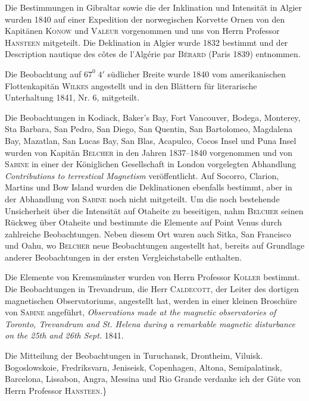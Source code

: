 Die Bestimmungen in Gibraltar sowie die der Inklination und Intensität in Algier wurden 1840 auf einer Expedition der norwegischen Korvette Ornen von den Kapitänen \textsc{Konow} und \textsc{Valeur} vorgenommen und uns von Herrn Professor \textsc{Hansteen} mitgeteilt. Die Deklination in Algier wurde 1832 bestimmt und der Description nautique des côtes de l’Algérie par \textsc{Bérard} (Paris 1839) entnommen.

Die Beobachtung auf $67^0\;4'$ südlicher Breite wurde 1840 vom amerikanischen Flottenkapitän \textsc{Wilkes} angestellt und in den Blättern für literarische Unterhaltung 1841, Nr. 6, mitgeteilt.

Die Beobachtungen in Kodiack, Baker’s Bay, Fort Vancouver, Bodega, Monterey, Sta Barbara, San Pedro, San Diego, San Quentin, San Bartolomeo, Magdalena Bay, Mazatlan, San Lucas Bay, San Blas, Acapulco, Cocos Insel und Puna Insel wurden von Kapitän \textsc{Belcher} in den Jahren 1837–1840 vorgenommen und von \textsc{Sabine} in einer der Königlichen Gesellschaft in London vorgelegten Abhandlung \textit{Contributions to terrestical Magnetism} veröffentlicht. Auf Socorro, Clarion, Martins und Bow Island wurden die Deklinationen ebenfalls bestimmt, aber in der Abhandlung von \textsc{Sabine} noch nicht mitgeteilt. Um die noch bestehende Unsicherheit über die Intensität auf Otaheite zu beseitigen, nahm \textsc{Belcher} seinen Rückweg über Otaheite und bestimmte die Elemente auf Point Venus durch zahlreiche Beobachtungen. Neben diesem Ort waren auch Sitka, San Francisco und Oahu, wo \textsc{Belcher} neue Beobachtungen angestellt hat, bereits auf Grundlage anderer Beobachtungen in der ersten Vergleichstabelle enthalten.

Die Elemente von Kremsmünster wurden von Herrn Professor \textsc{Koller} bestimmt. Die Beobachtungen in Trevandrum, die Herr \textsc{Caldecott}, der Leiter des dortigen magnetischen Observatoriums, angestellt hat, werden in einer kleinen Broschüre von \textsc{Sabine} angeführt, \textit{Observations made at the magnetic observatories of Toronto, Trevandrum and St. Helena during a remarkable magnetic disturbance on the 25th and 26th Sept.} 1841.

Die Mitteilung der Beobachtungen in Turuchansk, Drontheim, Viluisk. Bogoslowskoie, Fredriksvarn, Jeniseisk, Copenhagen, Altona, Semipalatinsk, Barcelona, Lissabon, Angra, Messina und Rio Grande verdanke ich der Güte von Herrn Professor \textsc{Hansteen}.\}
